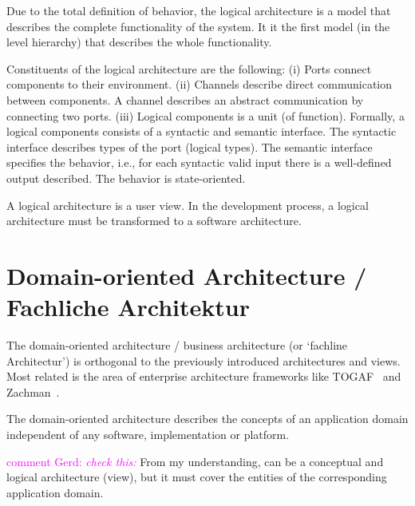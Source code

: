 \documentclass{llncs} %
\newcommand{\ggr}[1]{\textcolor{magenta}{comment Gerd: \textit{#1}}}
\begin{document}
Due to the total definition of behavior, the logical architecture is a model that describes
the complete functionality of the system. It it the first model (in the level hierarchy) 
that describes the whole functionality.  

Constituents of the logical architecture are the following:
(i) Ports connect components to their environment.
  (ii) Channels describe direct communication between components. A channel describes an abstract
	communication by connecting two ports. (iii) Logical components is a unit (of function).
	Formally, a logical components consists of a syntactic and semantic interface. The syntactic interface
	describes types of the port (logical types). The semantic interface specifies the behavior, i.e., for
	each syntactic valid input there is a well-defined output described. The behavior is state-oriented.




A logical architecture is a user view. In the development process, a logical architecture
must be transformed to a software architecture.

\section{Domain-oriented Architecture / Fachliche Architektur}

The domain-oriented architecture / business architecture (or `fachline Architectur')
is orthogonal to the previously introduced architectures and views.
Most related is the area of enterprise architecture frameworks like TOGAF~\cite{togaf91}
and Zachman~\cite{Zachman1987AFF}.

The domain-oriented architecture describes the concepts of an application domain
independent of any software, implementation or platform.

\ggr{check this:} From my understanding, can be a conceptual and logical architecture (view),
but it must cover the entities of the corresponding application domain.
\end{document}
